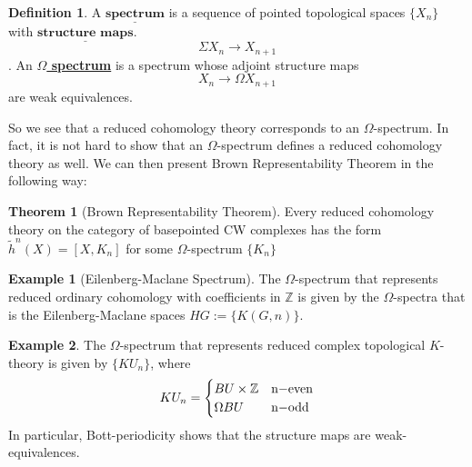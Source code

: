 \documentclass{article}
\theoremstyle{definition}
\newtheorem{theorem}{Theorem}[section]
\theoremstyle{definition}
\newtheorem{definition}{Definition}[theorem]
\theoremstyle{definition}
\theoremstyle{definition}
\theoremstyle{definition}
\theoremstyle{definition}
\theoremstyle{definition}
\newtheorem{example}{Example}[theorem]
\begin{document}
\begin{tcolorbox}[colback=purple!5!white,colframe=purple!75!black]
\begin{definition}
A $\underline{\textbf{spectrum}}$ is a sequence of pointed topological spaces $\{X_n\}$ with $\underline{\textbf{structure maps}}$.
\[\Sigma X_n\to X_{n+1}\]
. An \underline{\textbf{$\Omega$ spectrum}} is a spectrum whose adjoint structure maps
\[X_n\to \Omega X_{n+1}\]
are weak equivalences. 
\end{definition}
\end{tcolorbox}
So we see that a reduced cohomology theory corresponds to an $\Omega$-spectrum. In fact, it is not hard to show that an $\Omega$-spectrum defines a reduced cohomology theory as well. We can then present Brown Representability Theorem in the following way:
\begin{tcolorbox}[colback=red!5!white,colframe=red!30!white]
\begin{theorem}[Brown Representability Theorem]
    Every reduced cohomology theory on the category of basepointed CW complexes  has the form $\tilde{h}^n(X) = [X,K_n]$ for some $\Omega$-spectrum $\{K_n\}$
\end{theorem}
\end{tcolorbox}

\begin{tcolorbox}[colback=yellow!5!white,colframe=yellow!30!white]
\begin{example}[Eilenberg-Maclane Spectrum]
The $\Omega$-spectrum that represents reduced ordinary cohomology with coefficients in $\mathbb{Z}$ is given by the $\Omega$-spectra that is the Eilenberg-Maclane spaces $HG:=\{K(G,n)\}$.
\end{example}
\end{tcolorbox}

\begin{tcolorbox}[colback=yellow!5!white,colframe=yellow!30!white]
\begin{example}
    The $\Omega$-spectrum that represents reduced complex topological $K$-theory is given by $\{KU_n\}$, where 
    \[  KU_n=
    \begin{cases}
        BU\times \mathbb{Z}& $n$-\textrm{even}\\
        \Omega BU & $n$-\textrm{odd}
    \end{cases}\]
  In particular, Bott-periodicity shows that the structure maps are weak-equivalences.
\end{example}
\end{tcolorbox}
\end{document}
